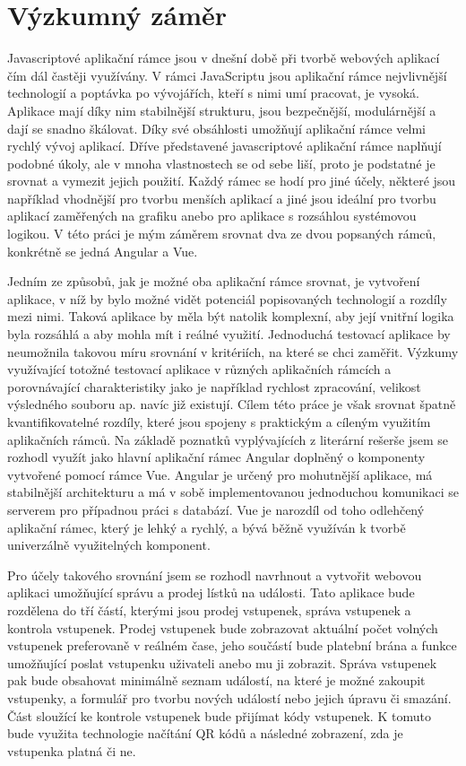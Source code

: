 \chapter{Výzkumný záměr}
Javascriptové aplikační rámce jsou v dnešní době při tvorbě webových aplikací čím dál častěji využívány. V rámci JavaScriptu jsou aplikační rámce nejvlivnější technologií a poptávka po vývojářích, kteří s nimi umí pracovat, je vysoká. Aplikace mají díky nim stabilnější strukturu, jsou bezpečnější, modulárnější a dají se snadno škálovat. Díky své obsáhlosti umožňují aplikační rámce velmi rychlý vývoj aplikací. Dříve představené javascriptové aplikační rámce naplňují podobné úkoly, ale v mnoha vlastnostech se od sebe liší, proto je podstatné je srovnat a vymezit jejich použití. Každý rámec se hodí pro jiné účely, některé jsou například vhodnější pro tvorbu menších aplikací a jiné jsou ideální pro tvorbu aplikací zaměřených na grafiku anebo pro aplikace s rozsáhlou systémovou logikou. V této práci je mým záměrem srovnat dva ze dvou popsaných rámců, konkrétně se jedná Angular a Vue.

Jedním ze způsobů, jak je možné oba aplikační rámce srovnat, je vytvoření aplikace, v níž by bylo možné vidět potenciál popisovaných technologií a rozdíly mezi nimi. Taková aplikace by měla být natolik komplexní, aby její vnitřní logika byla rozsáhlá a aby mohla mít i reálné využití. Jednoduchá testovací aplikace by neumožnila takovou míru srovnání v kritériích, na které se chci zaměřit. Výzkumy využívající totožné testovací aplikace v různých aplikačních rámcích a porovnávající charakteristiky jako je například rychlost zpracování, velikost výsledného souboru ap. navíc již existují. Cílem této práce je však srovnat špatně kvantifikovatelné rozdíly, které jsou spojeny s praktickým a cíleným využitím aplikačních rámců. Na základě poznatků vyplývajících z literární rešerše jsem se rozhodl využít jako hlavní aplikační rámec Angular doplněný o komponenty vytvořené pomocí rámce Vue. Angular je určený pro mohutnější aplikace, má stabilnější architekturu a má v sobě implementovanou jednoduchou komunikaci se serverem pro případnou práci s databází. Vue je narozdíl od toho odlehčený aplikační rámec, který je lehký a rychlý, a bývá běžně využíván k tvorbě univerzálně využitelných komponent.

Pro účely takového srovnání jsem se rozhodl navrhnout a vytvořit webovou aplikaci umožňující správu a prodej lístků na události. Tato aplikace bude rozdělena do tří částí, kterými jsou prodej vstupenek, správa vstupenek a kontrola vstupenek. Prodej vstupenek bude zobrazovat aktuální počet volných vstupenek preferovaně v reálném čase, jeho součástí bude platební brána a funkce umožňující poslat vstupenku uživateli anebo mu ji zobrazit. Správa vstupenek pak bude obsahovat minimálně seznam událostí, na které je možné zakoupit vstupenky, a formulář pro tvorbu nových událostí nebo jejich úpravu či smazání. Část sloužící ke kontrole vstupenek bude přijímat kódy vstupenek. K tomuto bude využita technologie načítání QR kódů a následné zobrazení, zda je vstupenka platná či ne.
